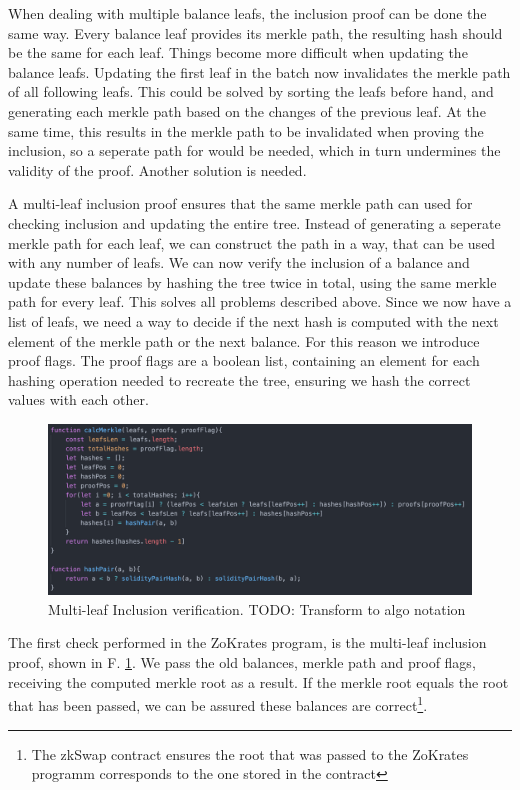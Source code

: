 \documentclass[../../thesis.tex]{subfiles}
\begin{document}
When dealing with multiple balance leafs, the inclusion proof can be done the same way. Every balance leaf provides its merkle path, the resulting hash should be the same for each leaf. Things become more difficult when updating the balance leafs. Updating the first leaf in the batch now invalidates the merkle path of all following leafs. This could be solved by sorting the leafs before hand, and generating each merkle path based on the changes of the previous leaf. At the same time, this results in the merkle path to be invalidated when proving the inclusion, so a seperate path for would be needed, which in turn undermines the validity of the proof. Another solution is needed. 

A multi-leaf inclusion proof ensures that the same merkle path can used for checking inclusion and updating the entire tree. Instead of generating a seperate merkle path for each leaf, we can construct the path in a way, that can be used with any number of leafs. We can now verify the inclusion of a balance and update these balances by hashing the tree twice in total, using the same merkle path for every leaf. This solves all problems described above. Since we now have a list of leafs, we need a way to decide if the next hash is computed with the next element of the merkle path or the next balance. For this reason we introduce proof flags. The proof flags are a boolean list, containing an element for each hashing operation needed to recreate the tree, ensuring we hash the correct values with each other. 

\begin{figure}[h]
    \centerline{\includegraphics[totalheight=5cm]{diagrams/multi-leaf.png}}
    \caption{Multi-leaf Inclusion verification. TODO: Transform to algo notation}
    \label{fig:multiLeaf}
\end{figure}

The first check performed in the ZoKrates program, is the multi-leaf inclusion proof, shown in F. \ref{fig:multiLeaf}. We pass the old balances, merkle path and proof flags, receiving the computed merkle root as a result. If the merkle root equals the root that has been passed, we can be assured these balances are correct\footnote{The zkSwap contract ensures the root that was passed to the ZoKrates programm corresponds to the one stored in the contract}.
\end{document}
